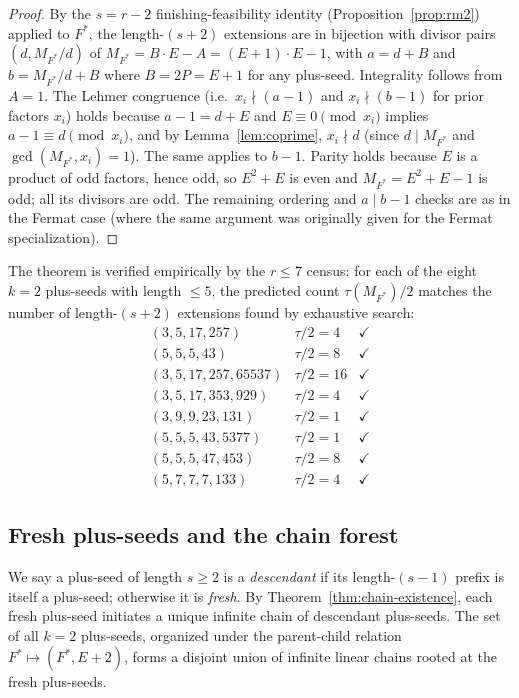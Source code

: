 \documentclass[11pt]{article}
\theoremstyle{definition}
\theoremstyle{remark}
\begin{document}
\begin{proof}
By the $s = r - 2$ finishing-feasibility identity
(Proposition~\ref{prop:rm2}) applied to $F^*$, the length-$(s+2)$ extensions
are in bijection with divisor pairs $(d, M_{F^*}/d)$ of $M_{F^*} =
B \cdot E - A = (E+1) \cdot E - 1$, with $a = d + B$ and $b =
M_{F^*}/d + B$ where $B = 2P = E + 1$ for any plus-seed.
Integrality follows from $A = 1$.  The Lehmer congruence (i.e.\
$x_i \nmid (a - 1)$ and $x_i \nmid (b - 1)$ for prior factors $x_i$)
holds because $a - 1 = d + E$ and $E \equiv 0 \pmod{x_i}$ implies
$a - 1 \equiv d \pmod{x_i}$, and by Lemma~\ref{lem:coprime},
$x_i \nmid d$ (since $d \mid M_{F^*}$ and $\gcd(M_{F^*}, x_i) = 1$).
The same applies to $b - 1$.  Parity holds because $E$ is a product
of odd factors, hence odd, so $E^2 + E$ is even and $M_{F^*} = E^2 +
E - 1$ is odd; all its divisors are odd.  The remaining ordering and
$a \mid b - 1$ checks are as in the Fermat
case (where the same argument was originally given for the Fermat
specialization).
\end{proof}

The theorem is verified empirically by the $r \le 7$ census: for each
of the eight $k = 2$ plus-seeds with length $\le 5$, the predicted
count $\tau(M_{F^*}) / 2$ matches the number of length-$(s+2)$
extensions found by exhaustive search:
\[
  \begin{array}{lll}
  (3, 5, 17, 257)              & \tau / 2 = 4  & \checkmark \\
  (5, 5, 5, 43)                & \tau / 2 = 8  & \checkmark \\
  (3, 5, 17, 257, 65537)        & \tau / 2 = 16 & \checkmark \\
  (3, 5, 17, 353, 929)          & \tau / 2 = 4  & \checkmark \\
  (3, 9, 9, 23, 131)            & \tau / 2 = 1  & \checkmark \\
  (5, 5, 5, 43, 5377)           & \tau / 2 = 1  & \checkmark \\
  (5, 5, 5, 47, 453)            & \tau / 2 = 8  & \checkmark \\
  (5, 7, 7, 7, 133)             & \tau / 2 = 4  & \checkmark
  \end{array}
\]

\subsection{Fresh plus-seeds and the chain forest}

We say a plus-seed of length $s \ge 2$ is a \emph{descendant} if its
length-$(s-1)$ prefix is itself a plus-seed; otherwise it is
\emph{fresh}.  By Theorem~\ref{thm:chain-existence}, each fresh
plus-seed initiates a unique infinite chain of descendant plus-seeds.
The set of all $k = 2$ plus-seeds, organized under the parent-child
relation $F^* \mapsto (F^*, E + 2)$, forms a disjoint union of
infinite linear chains rooted at the fresh plus-seeds.
\end{document}
